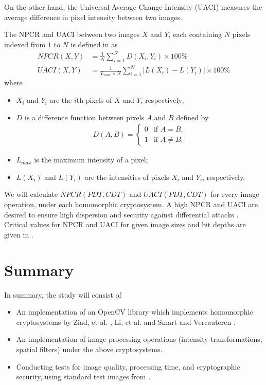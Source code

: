 \begin{description}
		On the other hand, the Universal Average Change Intensity (UACI) measures the average difference in pixel intensity between two images.

		The NPCR and UACI between two images $X$ and $Y$, each containing $N$ pixels indexed from $1$ to $N$ is defined in \cite{wu_npcr_2011} as
		\begin{align}
			NPCR(X,Y) &= \frac{1}{N}\sum_{i = 1}^{N}{D(X_i,Y_i)} \times 100\%\\
			UACI(X,Y) &= \frac{1}{L_{max} \times N} \sum_{i = 1}^{N}{ |L(X_i) - L(Y_i)| } \times 100\%
		\end{align}
		where
		\begin{itemize}
			\item $X_i$ and $Y_i$ are the $i$th pixels of $X$ and $Y$, respectively;
			\item $D$ is a difference function between pixels $A$ and $B$ defined by
			\begin{align}
				D(A,B) =
				\begin{cases}
					0 &  \text{if $A = B$},\\
					1 &  \text{if $A \neq B$};
				\end{cases}
			\end{align}
		\item $L_{max}$ is the maximum intensity of a pixel;
		\item $L(X_i)$ and $L(Y_i)$ are the intensities of pixels $X_i$ and $Y_i$, respectively.
		\end{itemize}
		We will calculate $NPCR(PDT,CDT)$ and $UACI(PDT,CDT)$  for every image operation, under each homomorphic cryptosystem. A high NPCR and UACI are desired to ensure high dispersion and security against differential attacks \cite{ahmed_benchmark_2016}. Critical values for NPCR and UACI for given image sizes and bit depths are given in  \cite{wu_npcr_2011}.
\end{description}

\section{Summary}

In summary, the study will consist of
\begin{itemize}
	\item An implementation of an OpenCV library which implements homomorphic cryptosystems by Ziad, et al. \cite{ziad_cryptoimg:_2016}, Li, et al. \cite{li_elliptic_2012} and Smart and Vercauteren \cite{hutchison_fully_2010}.
	\item An implementation of image processing operations (intensity transformations, spatial filters) under the above cryptosystems.
	\item Conducting tests for image quality, processing time, and cryptographic security, using standard test images from \cite{gonzalez_image_nodate}.
\end{itemize}

